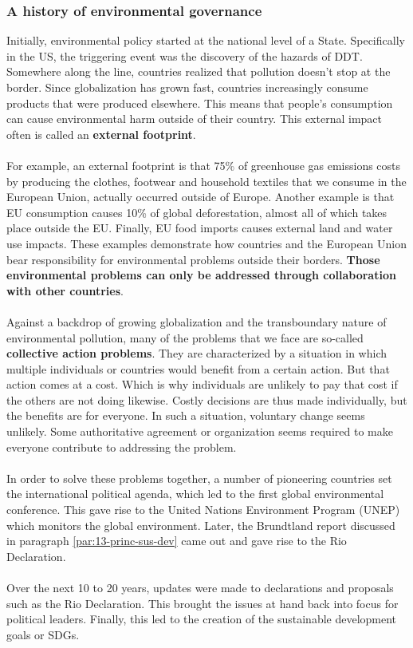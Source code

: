 \documentclass[../summary.tex]{subfiles}
\begin{document}
		\subsubsection{A history of environmental governance}
			Initially, environmental policy started at the national level of a State. Specifically in the US, the triggering event was the discovery of the hazards of DDT. Somewhere along the line, countries realized that pollution doesn't stop at the border. Since globalization has grown fast, countries increasingly consume products that were produced elsewhere.
			This means that people's consumption can cause environmental harm outside of their country. This external impact often is called an \textbf{external footprint}.
			\\\\
			For example, an external footprint is that 75\% of greenhouse gas emissions costs by producing the clothes, footwear and household textiles that we consume in the European Union, actually occurred outside of Europe. Another example is that EU consumption causes 10\% of global deforestation, almost all of which takes place outside the EU. Finally, EU food imports causes external land and water use impacts. These examples demonstrate how countries and the European Union bear responsibility for environmental problems outside their borders. \textbf{Those environmental problems can only be addressed through collaboration with other countries}.
			\\\\
			Against a backdrop of growing globalization and the transboundary nature of environmental pollution, many of the problems that we face are so-called \textbf{collective action problems}. They are characterized by a situation in which multiple individuals or countries would benefit from a certain action. But that action comes at a cost. Which is why individuals are unlikely to pay that cost if the others are not doing likewise. Costly decisions are thus made individually, but the benefits are for everyone. In such a situation, voluntary change seems unlikely. Some authoritative agreement or organization seems required to make everyone contribute to addressing the problem.
			\\\\
			In order to solve these problems together, a number of pioneering countries set the international political agenda, which led to the first global environmental conference. This gave rise to the United Nations Environment Program (UNEP) which monitors the global environment. Later, the Brundtland report discussed in paragraph \ref{par:13-princ-sus-dev} came out and gave rise to the Rio Declaration. \\\\
			Over the next 10 to 20 years, updates were made to declarations and proposals such as the Rio Declaration. This brought the issues at hand back into focus for political leaders. Finally, this led to the creation of the sustainable development goals or SDGs. 
		
\end{document}
